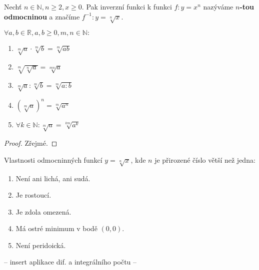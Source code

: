 \begin{definition}
    Nechť $n\in \mathbb N, n\geq 2, x \geq 0.$ Pak inverzní funkci k funkci
    $f:y=x^n$ nazýváme \textbf{$n$-tou odmocninou} a značíme $f^{-1}: y=\sqrt[n]{x}.$
\end{definition}

\begin{veta}
    $\forall a,b \in \mathbb R, a,b \geq 0, m,n \in \mathbb N:$
    \begin{enumerate}[$i.$]
        \item $\sqrt[m]{a}\cdot \sqrt[m]{b}=\sqrt[m]{ab}$
       	\item $\sqrt[m]{\sqrt[n]{a} } = \sqrt[mn]{a}$
       	\item $\sqrt[m]{a} : \sqrt[m]{b} = \sqrt[m]{a:b}$
       	\item $\left ( \sqrt[m]{a}  \right )^n = \sqrt[m]{a^n}  $
       	\item $\forall k \in \mathbb N: \sqrt[m]{a}=\sqrt[km]{a^k}$
    \end{enumerate}
\end{veta}

\begin{proof}
    Zřejmé.
\end{proof}

\begin{veta}
    Vlastnosti odmocninných funkcí $y= \sqrt[n]{x}$, kde $n$ je přirozené číslo větší
    než jedna:
    \begin{enumerate}[$i.$]
        \item Není ani lichá, ani sudá.
       	\item Je rostoucí.
        \item Je zdola omezená.
        \item Má ostré minimum v bodě $(0,0).$
        \item Není peridoická.
    \end{enumerate}
\end{veta}

-- insert aplikace dif. a integrálního počtu --
